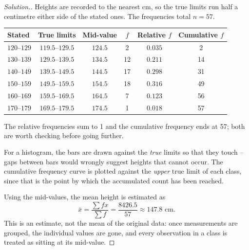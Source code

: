 \documentclass[11pt,a4paper]{article}
\theoremstyle{definition}
\newenvironment{solution}
  {\renewcommand{\qedsymbol}{}\begin{proof}[\textit{Solution}.]}
  {\end{proof}}
\begin{document}
\begin{solution}
Heights are recorded to the nearest cm, so the true limits run half a centimetre either
side of the stated ones. The frequencies total $n = 57$.
\begin{table}[H]
\centering
\begin{tabular}{lccccc}
Stated & True limits & Mid-value & $f$ & Relative $f$ & Cumulative $f$\\
\hline
$120$--$129$ & $119.5$--$129.5$ & $124.5$ & 2  & $0.035$ & 2\\
$130$--$139$ & $129.5$--$139.5$ & $134.5$ & 12 & $0.211$ & 14\\
$140$--$149$ & $139.5$--$149.5$ & $144.5$ & 17 & $0.298$ & 31\\
$150$--$159$ & $149.5$--$159.5$ & $154.5$ & 18 & $0.316$ & 49\\
$160$--$169$ & $159.5$--$169.5$ & $164.5$ & 7  & $0.123$ & 56\\
$170$--$179$ & $169.5$--$179.5$ & $174.5$ & 1  & $0.018$ & 57\\
\end{tabular}
\end{table}
The relative frequencies sum to 1 and the cumulative frequency ends at 57; both are worth
checking before going further.

For a histogram, the bars are drawn against the \emph{true} limits so that they touch --
gaps between bars would wrongly suggest heights that cannot occur. The cumulative frequency
curve is plotted against the \emph{upper} true limit of each class, since that is the point
by which the accumulated count has been reached.

Using the mid-values, the mean height is estimated as
\[\bar{x} = \frac{\sum fx}{\sum f} = \frac{8426.5}{57} \approx 147.8 \text{ cm}.\]
This is an estimate, not the mean of the original data: once measurements are grouped, the
individual values are gone, and every observation in a class is treated as sitting at its
mid-value.
\end{solution}
\end{document}
